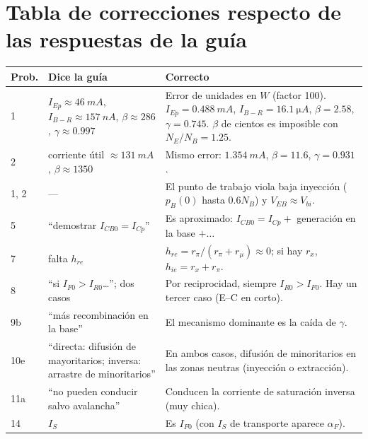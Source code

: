 \documentclass[11pt,a4paper]{article}
\newcommand{\aF}{\alpha_F}
\begin{document}
\section*{Tabla de correcciones respecto de las respuestas de la guía}
\begin{table}[H]
\centering\small
\begin{tabularx}{\textwidth}{@{}lX X@{}}
\toprule
Prob. & Dice la guía & Correcto \\
\midrule
1 & $I_{Ep}\approx\SI{46}{mA}$, $I_{B-R}\approx\SI{157}{nA}$, $\beta\approx286$, $\gamma\approx0.997$ &
Error de unidades en $W$ (factor 100). $I_{Ep}=\SI{0.488}{mA}$, $I_{B-R}=\SI{16.1}{\micro A}$,
$\beta=2.58$, $\gamma=0.745$. $\beta$ de cientos es imposible con $N_E/N_B=1.25$. \\
2 & corriente útil $\approx\SI{131}{mA}$, $\beta\approx1350$ & Mismo error: $\SI{1.354}{mA}$,
$\beta=11.6$, $\gamma=0.931$. \\
1, 2 & --- & El punto de trabajo viola baja inyección ($p_B(0)$ hasta $0.6N_B$) y $V_{EB}\approx V_{bi}$. \\
5 & ``demostrar $I_{CB0}=I_{Cp}$'' & Es aproximado: $I_{CB0}=I_{Cp}+$ generación en la base $+\ldots$ \\
7 & falta $h_{re}$ & $h_{re}=r_\pi/(r_\pi+r_\mu)\approx0$; si hay $r_x$, $h_{ie}=r_x+r_\pi$. \\
8 & ``si $I_{F0}>I_{R0}$\ldots''; dos casos & Por reciprocidad, siempre $I_{R0}>I_{F0}$. Hay un
tercer caso (E--C en corto). \\
9b & ``más recombinación en la base'' & El mecanismo dominante es la caída de $\gamma$. \\
10e & ``directa: difusión de mayoritarios; inversa: arrastre de minoritarios'' & En ambos casos,
difusión de minoritarios en las zonas neutras (inyección o extracción). \\
11a & ``no pueden conducir salvo avalancha'' & Conducen la corriente de saturación inversa (muy chica). \\
14 & $I_S$ & Es $I_{F0}$ (con $I_S$ de transporte aparece $\aF$). \\
\bottomrule
\end{tabularx}
\end{table}
\end{document}
